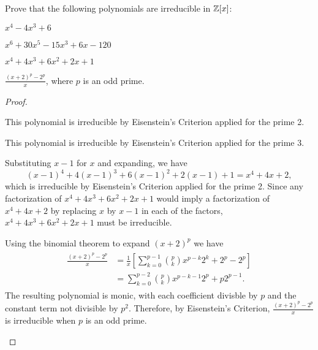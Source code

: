 \documentclass[10pt]{amsart}
\begin{document}
\begin{thm}
  \label{Ex2}
  Prove that the following polynomials are irreducible in $\mathbb{Z}[x]$:
  \begin{alphaenum}
  \item
    $x^4 - 4x^3 + 6$
  \item
    $x^6 + 30x^5 - 15x^3 + 6x - 120$
  \item
    $x^4 + 4x^3 + 6x^2 +2x + 1$
  \item
    $\frac{(x+2)^p - 2^p}{x}$, where $p$ is an odd prime.
  \end{alphaenum}
  \begin{proof}
    \begin{alphaenum}
    \item
      This polynomial is irreducible by Eisenstein's Criterion applied for the prime 2.
    \item
      This polynomial is irreducible by Eisenstein's Criterion applied for the prime 3.
    \item
      Substituting $x-1$ for $x$ and expanding, we have $$(x-1)^4 + 4(x-1)^3 + 6(x-1)^2 + 2(x-1)+1 = x^4 + 4x + 2,$$ which is irreducible by Eisenstein's Criterion applied for the prime 2.  
      Since any factorization of $x^4 + 4x^3 + 6x^2 +2x + 1$ would imply a factorization of $x^4 + 4x + 2$ by replacing $x$ by $x-1$ in each of the factors, $x^4 + 4x^3 + 6x^2 +2x + 1$ must be irreducible.
    \item
      Using the binomial theorem to expand $(x+2)^p$ we have 
      \begin{align*}
        \begin{split}
          \frac{(x+2)^p - 2^p}{x} &= \frac{1}{x}\left[\sum_{k=0}^{p-1}{p \choose k}x^{p-k}2^k + 2^p - 2^p\right]\\
          &= \sum_{k=0}^{p-2}{p \choose k}x^{p-k-1}2^p + p2^{p-1}.
        \end{split}
      \end{align*}
      The resulting polynomial is monic, with each coefficient divisble by $p$ and the constant term not divisible by $p^2$.
      Therefore, by Eisenstein's Criterion, $\frac{(x+2)^p - 2^p}{x}$ is irreducible when $p$ is an odd prime.
    \end{alphaenum}
    
  \end{proof}
\end{thm}
\end{document}
